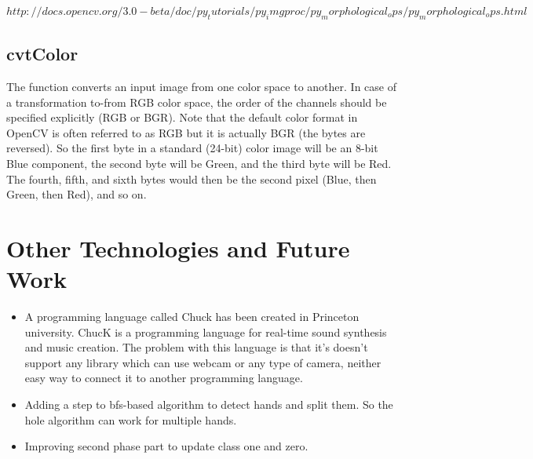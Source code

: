 \documentclass{report}
\begin{document}
\textit{$http://docs.opencv.org/3.0-beta/doc/py_tutorials/py_imgproc/py_morphological_ops/py_morphological_ops.html$}

\section{cvtColor}
The function converts an input image from one color space to another. In case of a transformation to-from RGB color space, the order of the channels should be specified explicitly (RGB or BGR). Note that the default color format in OpenCV is often referred to as RGB but it is actually BGR (the bytes are reversed). So the first byte in a standard (24-bit) color image will be an 8-bit Blue component, the second byte will be Green, and the third byte will be Red. The fourth, fifth, and sixth bytes would then be the second pixel (Blue, then Green, then Red), and so on.

\chapter{Other Technologies and Future Work}
\begin{itemize}
\item{A programming language called Chuck has been created in Princeton university. ChucK is a programming language for real-time sound synthesis and music creation. The problem with this language is that it's doesn't support any library which can use webcam or any type of camera, neither easy way to connect it to another programming language.}
\item{Adding a step to bfs-based algorithm to detect hands and split them. So the hole algorithm can work for multiple hands.}
\item{Improving second phase part to update class one and zero.}
\end{itemize}




\end{document}
